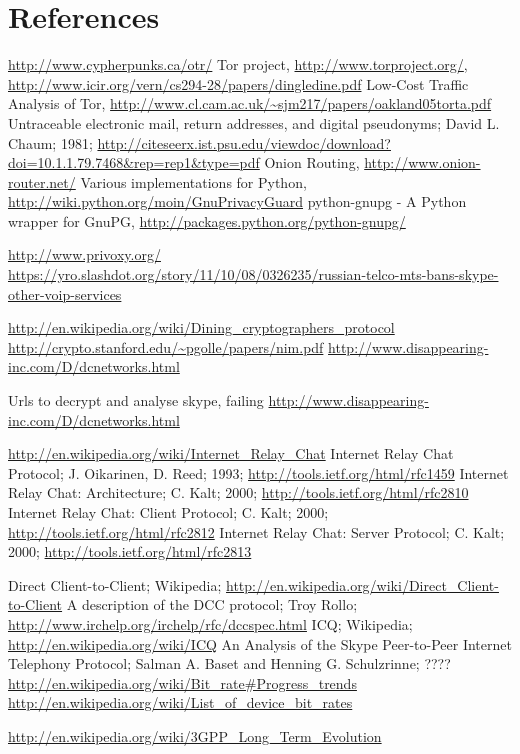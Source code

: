 \section{References}
\begin{thebibliography}{666}
 \url{http://www.cypherpunks.ca/otr/}
 Tor project, \url{http://www.torproject.org/},
    \url{http://www.icir.org/vern/cs294-28/papers/dingledine.pdf}
 Low-Cost Traffic Analysis of Tor,
    \url{http://www.cl.cam.ac.uk/~sjm217/papers/oakland05torta.pdf}
 Untraceable electronic mail, return addresses, and digital pseudonyms;
    David L. Chaum; 1981;
    \url{http://citeseerx.ist.psu.edu/viewdoc/download?doi=10.1.1.79.7468&rep=rep1&type=pdf}
 Onion Routing, \url{http://www.onion-router.net/}
 Various implementations for Python,
    \url{http://wiki.python.org/moin/GnuPrivacyGuard}
 python-gnupg - A Python wrapper for GnuPG,
    \url{http://packages.python.org/python-gnupg/}

 \url{http://www.privoxy.org/}
\url{https://yro.slashdot.org/story/11/10/08/0326235/russian-telco-mts-bans-skype-other-voip-services}

\url{http://en.wikipedia.org/wiki/Dining_cryptographers_protocol}
\url{http://crypto.stanford.edu/~pgolle/papers/nim.pdf}
\url{http://www.disappearing-inc.com/D/dcnetworks.html}

 Urls to decrypt and analyse skype, failing
\url{http://www.disappearing-inc.com/D/dcnetworks.html}

 \url{http://en.wikipedia.org/wiki/Internet_Relay_Chat}
 Internet Relay Chat Protocol; J. Oikarinen, D. Reed; 1993;
    \url{http://tools.ietf.org/html/rfc1459}
 Internet Relay Chat: Architecture; C. Kalt; 2000;
    \url{http://tools.ietf.org/html/rfc2810}
 Internet Relay Chat: Client Protocol; C. Kalt; 2000;
    \url{http://tools.ietf.org/html/rfc2812}
 Internet Relay Chat: Server Protocol; C. Kalt; 2000;
    \url{http://tools.ietf.org/html/rfc2813}

 Direct Client-to-Client; Wikipedia;
    \url{http://en.wikipedia.org/wiki/Direct_Client-to-Client}
 A description of the DCC protocol; Troy Rollo;
    \url{http://www.irchelp.org/irchelp/rfc/dccspec.html}
 ICQ; Wikipedia;
    \url{http://en.wikipedia.org/wiki/ICQ}
 An Analysis of the Skype Peer-to-Peer Internet
Telephony Protocol;
Salman A. Baset and Henning G. Schulzrinne;
????
 \url{http://en.wikipedia.org/wiki/Bit_rate#Progress_trends}
 \url{http://en.wikipedia.org/wiki/List_of_device_bit_rates}

 \url{http://en.wikipedia.org/wiki/3GPP_Long_Term_Evolution}

\end{thebibliography}

